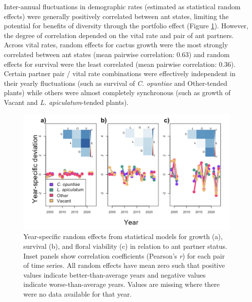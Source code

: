 \documentclass[11pt]{article}
\begin{document}
Inter-annual fluctuations in demographic rates (estimated as statistical random effects) were generally positively correlated between ant states, limiting the potential for benefits of diversity through the portfolio effect (Figure \ref{fig:Annual_Ant}). 
However, the degree of correlation depended on the vital rate and pair of ant partners. 
Across vital rates, random effects for cactus growth were the most strongly correlated between ant states (mean pairwise correlation: 0.63) and random effects for survival were the least correlated (mean pairwise correlation: 0.36).  
Certain partner pair / vital rate combinations were effectively independent in their yearly fluctuations (such as survival of \textit{C. opuntiae} and Other-tended plants) while others were almost completely synchronous (such as growth of Vacant and \textit{L. apiculatum}-tended plants). 

\begin{figure}[H]
	\includegraphics[width=0.75\linewidth]{Figures/ant_RFX.png}
	\caption{Year-specific random effects from statistical models for growth (a), survival (b), and floral viability (c) in relation to ant partner status. Inset panels show correlation coefficients (Pearson's \textit{r}) for each pair of time series. All random effects have mean zero such that positive values indicate better-than-average years and negative values indicate worse-than-average years. Values are missing where there were no data available for that year.}
	\label{fig:Annual_Ant}
\end{figure}
\end{document}
